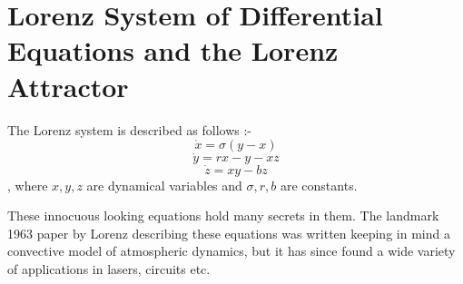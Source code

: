 
\chapter{Lorenz System of Differential Equations and the Lorenz Attractor} %

\label{ChapterX} %


The Lorenz system\cite{lorenz_1963} is described as follows :-
$$\dot{x} = \sigma(y-x)$$
$$\dot{y} = rx - y - xz$$
$$\dot{z} = xy - bz$$,
where $x,y,z$ are dynamical variables and $\sigma,r,b$ are constants.

These innocuous looking equations hold many secrets in them. The landmark 1963 paper by Lorenz describing these equations was written keeping in mind a convective model of atmospheric dynamics, but it has since found a wide variety of applications in lasers, circuits etc.

